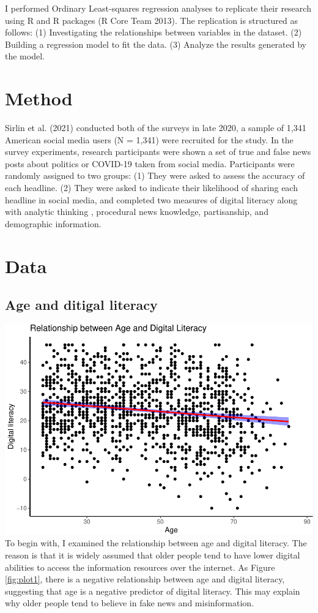 \documentclass[
]{article}
\begin{document}
I performed Ordinary Least-squares regression analyses to replicate their research using R and R packages (R Core Team 2013). The replication is structured as follows: (1) Investigating the relationships between variables in the dataset. (2) Building a regression model to fit the data. (3) Analyze the results generated by the model.

\hypertarget{method}{%
\section{Method}\label{method}}

Sirlin et al. (2021) conducted both of the surveys in late 2020, a sample of 1,341 American social media users (N = 1,341) were recruited for the study. In the survey experiments, research participants were shown a set of true and false news posts about politics or COVID-19 taken from social media. Participants were randomly assigned to two groups: (1) They were asked to assess the accuracy of each headline. (2) They were asked to indicate their likelihood of sharing each headline in social media, and completed two measures of digital literacy along with analytic thinking , procedural news knowledge, partisanship, and demographic information.

\hypertarget{data}{%
\section{Data}\label{data}}

\hypertarget{age-and-ditigal-literacy}{%
\subsection{Age and ditigal literacy}\label{age-and-ditigal-literacy}}

\includegraphics{Replication2019_files/figure-latex/plot1-1.pdf}
To begin with, I examined the relationship between age and digital literacy. The reason is that it is widely assumed that older people tend to have lower digital abilities to access the information resources over the internet. As Figure \label{fig:plot1} \ref{fig:plot1}, there is a negative relationship between age and digital literacy, suggesting that age is a negative predictor of digital literacy. This may explain why older people tend to believe in fake news and misinformation.
\end{document}
